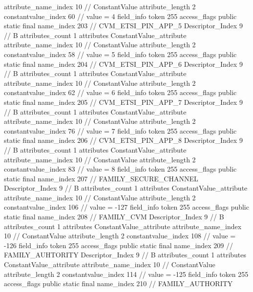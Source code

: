 {{{{{{{					attribute_name_index	10		// ConstantValue
					attribute_length	2
					constantvalue_index	60		// value = 4
				}
				}
			}
			field_info {
				token	255
				access_flags	public static final
				name_index	203		// CVM_ETSI_PIN_APP_5
				Descriptor_Index	9		// B
				attributes_count	1
				attributes {
				ConstantValue_attribute {
					attribute_name_index	10		// ConstantValue
					attribute_length	2
					constantvalue_index	58		// value = 5
				}
				}
			}
			field_info {
				token	255
				access_flags	public static final
				name_index	204		// CVM_ETSI_PIN_APP_6
				Descriptor_Index	9		// B
				attributes_count	1
				attributes {
				ConstantValue_attribute {
					attribute_name_index	10		// ConstantValue
					attribute_length	2
					constantvalue_index	62		// value = 6
				}
				}
			}
			field_info {
				token	255
				access_flags	public static final
				name_index	205		// CVM_ETSI_PIN_APP_7
				Descriptor_Index	9		// B
				attributes_count	1
				attributes {
				ConstantValue_attribute {
					attribute_name_index	10		// ConstantValue
					attribute_length	2
					constantvalue_index	76		// value = 7
				}
				}
			}
			field_info {
				token	255
				access_flags	public static final
				name_index	206		// CVM_ETSI_PIN_APP_8
				Descriptor_Index	9		// B
				attributes_count	1
				attributes {
				ConstantValue_attribute {
					attribute_name_index	10		// ConstantValue
					attribute_length	2
					constantvalue_index	83		// value = 8
				}
				}
			}
			field_info {
				token	255
				access_flags	public static final
				name_index	207		// FAMILY_SECURE_CHANNEL
				Descriptor_Index	9		// B
				attributes_count	1
				attributes {
				ConstantValue_attribute {
					attribute_name_index	10		// ConstantValue
					attribute_length	2
					constantvalue_index	106		// value = -127
				}
				}
			}
			field_info {
				token	255
				access_flags	public static final
				name_index	208		// FAMILY_CVM
				Descriptor_Index	9		// B
				attributes_count	1
				attributes {
				ConstantValue_attribute {
					attribute_name_index	10		// ConstantValue
					attribute_length	2
					constantvalue_index	108		// value = -126
				}
				}
			}
			field_info {
				token	255
				access_flags	public static final
				name_index	209		// FAMILY_AUHTORITY
				Descriptor_Index	9		// B
				attributes_count	1
				attributes {
				ConstantValue_attribute {
					attribute_name_index	10		// ConstantValue
					attribute_length	2
					constantvalue_index	114		// value = -125
				}
				}
			}
			field_info {
				token	255
				access_flags	public static final
				name_index	210		// FAMILY_AUTHORITY
}}}}}
